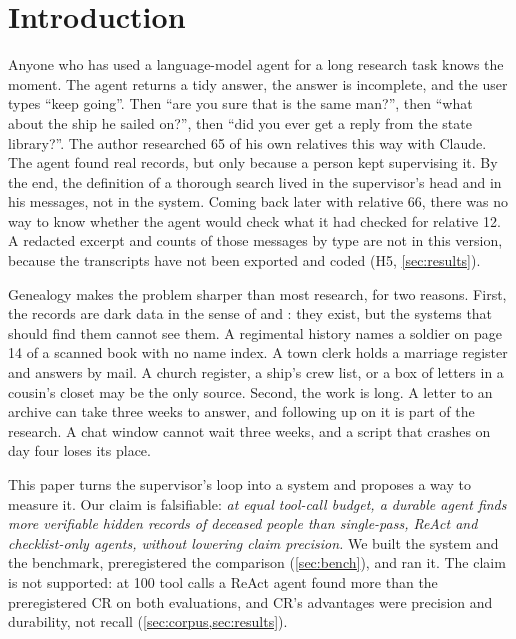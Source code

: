 \section{Introduction}
\label{sec:intro}

Anyone who has used a language-model agent for a long research task knows the moment. The agent returns a tidy answer, the answer is incomplete, and the user types ``keep going''. Then ``are you sure that is the same man?'', then ``what about the ship he sailed on?'', then ``did you ever get a reply from the state library?''. The author researched 65 of his own relatives this way with Claude. The agent found real records, but only because a person kept supervising it. By the end, the definition of a thorough search lived in the supervisor's head and in his messages, not in the system. Coming back later with relative 66, there was no way to know whether the agent would check what it had checked for relative 12. A redacted excerpt and counts of those messages by type are not in this version, because the transcripts have not been exported and coded (H5, \cref{sec:results}).

Genealogy makes the problem sharper than most research, for two reasons. First, the records are dark data in the sense of \citet{heidorn2008dark} and \citet{hand2020dark}: they exist, but the systems that should find them cannot see them. A regimental history names a soldier on page 14 of a scanned book with no name index. A town clerk holds a marriage register and answers by mail. A church register, a ship's crew list, or a box of letters in a cousin's closet may be the only source. Second, the work is long. A letter to an archive can take three weeks to answer, and following up on it is part of the research. A chat window cannot wait three weeks, and a script that crashes on day four loses its place.

This paper turns the supervisor's loop into a system and proposes a way to measure it. Our claim is falsifiable: \emph{at equal tool-call budget, a durable \CR agent finds more verifiable hidden records of deceased people than single-pass, ReAct and checklist-only agents, without lowering claim precision.} We built the system and the benchmark, preregistered the comparison (\cref{sec:bench}), and ran it. The claim is not supported: at 100 tool calls a ReAct agent found more than the preregistered CR on both evaluations, and CR's advantages were precision and durability, not recall (\cref{sec:corpus,sec:results}).

